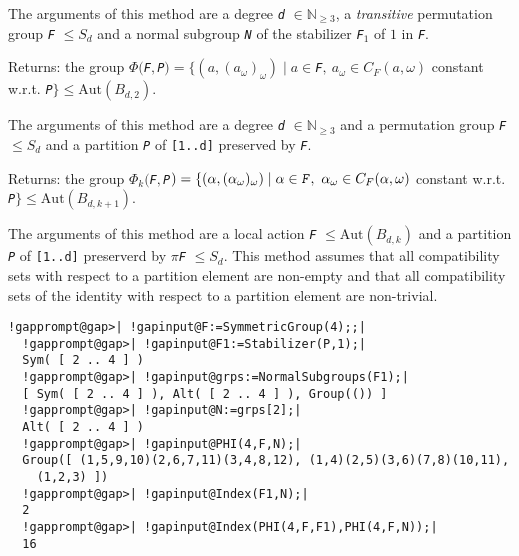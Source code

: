\documentclass[a4paper,11pt]{report}
\begin{document}
{{{\begin{description}
 The arguments of this method are a degree \mbox{\texttt{\mdseries\slshape d}} $\in\mathbb{N}_{\ge 3}$, a \emph{transitive} permutation group \mbox{\texttt{\mdseries\slshape F}} $\le S_{d}$ and a normal subgroup \mbox{\texttt{\mdseries\slshape N}} of the stabilizer \mbox{\texttt{\mdseries\slshape F}}$_{1}$ of $1$ in \mbox{\texttt{\mdseries\slshape F}}. 
\item[{for the arguments \mbox{\texttt{\mdseries\slshape d}}, \mbox{\texttt{\mdseries\slshape F}}, \mbox{\texttt{\mdseries\slshape P}}}]  Returns: the group $\Phi($\mbox{\texttt{\mdseries\slshape F}}$,$\mbox{\texttt{\mdseries\slshape P}}$)=\{(a,(a_{\omega})_{\omega})\mid a\in $\mbox{\texttt{\mdseries\slshape F}}$,\ a_{\omega}\in C_{F}(a,\omega)$ constant w.r.t. \mbox{\texttt{\mdseries\slshape P}}$\}\le\mathrm{Aut}(B_{d,2})$. 

 The arguments of this method are a degree \mbox{\texttt{\mdseries\slshape d}} $\in\mathbb{N}_{\ge 3}$ and a permutation group \mbox{\texttt{\mdseries\slshape F}} $\le S_{d}$ and a partition \mbox{\texttt{\mdseries\slshape P}} of \texttt{[1..d]} preserved by \mbox{\texttt{\mdseries\slshape F}}. 
\item[{for the arguments \mbox{\texttt{\mdseries\slshape d}}, \mbox{\texttt{\mdseries\slshape k}}, \mbox{\texttt{\mdseries\slshape F}}, \mbox{\texttt{\mdseries\slshape P}}}]  Returns: the group $\Phi_{k}($\mbox{\texttt{\mdseries\slshape F}}$,$\mbox{\texttt{\mdseries\slshape P}}$)=\{(\alpha,(\alpha_{\omega})_{\omega})\mid \alpha\in \mbox{\texttt{\mdseries\slshape F}},\ \alpha_{\omega}\in C_{F}(\alpha,\omega)$ constant w.r.t. \mbox{\texttt{\mdseries\slshape P}}$\}\le\mathrm{Aut}(B_{d,k+1})$. 

 The arguments of this method are a local action \mbox{\texttt{\mdseries\slshape F}} $\le\mathrm{Aut}(B_{d,k})$ and a partition \mbox{\texttt{\mdseries\slshape P}} of \texttt{[1..d]} preserverd by $\pi$\mbox{\texttt{\mdseries\slshape F}} $\le S_{d}$. This method assumes that all compatibility sets with respect to a partition
element are non-empty and that all compatibility sets of the identity with
respect to a partition element are non-trivial. 
\end{description}
 

 }

 

 
\begin{Verbatim}[commandchars=!@|,fontsize=\small,frame=single,label=Example]
  !gapprompt@gap>| !gapinput@F:=SymmetricGroup(4);;|
  !gapprompt@gap>| !gapinput@F1:=Stabilizer(P,1);|
  Sym( [ 2 .. 4 ] )
  !gapprompt@gap>| !gapinput@grps:=NormalSubgroups(F1);|
  [ Sym( [ 2 .. 4 ] ), Alt( [ 2 .. 4 ] ), Group(()) ]
  !gapprompt@gap>| !gapinput@N:=grps[2];|
  Alt( [ 2 .. 4 ] )
  !gapprompt@gap>| !gapinput@PHI(4,F,N);|
  Group([ (1,5,9,10)(2,6,7,11)(3,4,8,12), (1,4)(2,5)(3,6)(7,8)(10,11), 
    (1,2,3) ])
  !gapprompt@gap>| !gapinput@Index(F1,N);|
  2
  !gapprompt@gap>| !gapinput@Index(PHI(4,F,F1),PHI(4,F,N));|
  16
\end{Verbatim}
 

}}
\end{document}
